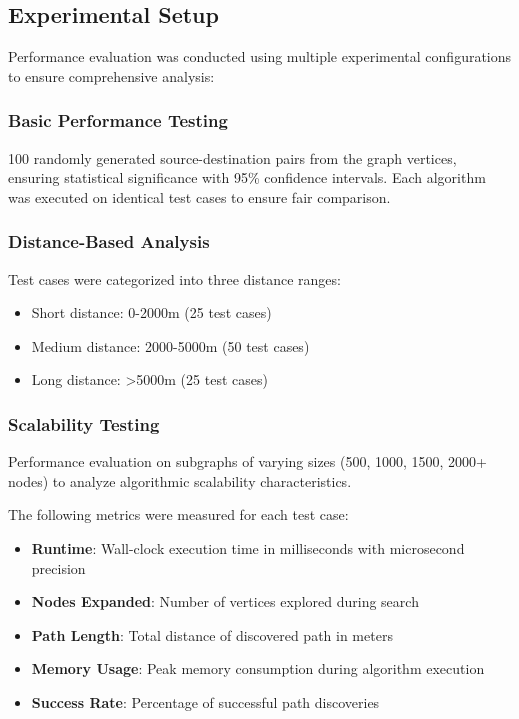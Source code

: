 \documentclass[conference]{IEEEtran}
\begin{document}
\subsection{Experimental Setup}

Performance evaluation was conducted using multiple experimental configurations to ensure comprehensive analysis:

\subsubsection{Basic Performance Testing}
100 randomly generated source-destination pairs from the graph vertices, ensuring statistical significance with 95\% confidence intervals. Each algorithm was executed on identical test cases to ensure fair comparison.

\subsubsection{Distance-Based Analysis}
Test cases were categorized into three distance ranges:
\begin{itemize}
\item Short distance: 0-2000m (25 test cases)
\item Medium distance: 2000-5000m (50 test cases)
\item Long distance: >5000m (25 test cases)
\end{itemize}

\subsubsection{Scalability Testing}
Performance evaluation on subgraphs of varying sizes (500, 1000, 1500, 2000+ nodes) to analyze algorithmic scalability characteristics.

The following metrics were measured for each test case:
\begin{itemize}
\item \textbf{Runtime}: Wall-clock execution time in milliseconds with microsecond precision
\item \textbf{Nodes Expanded}: Number of vertices explored during search
\item \textbf{Path Length}: Total distance of discovered path in meters
\item \textbf{Memory Usage}: Peak memory consumption during algorithm execution
\item \textbf{Success Rate}: Percentage of successful path discoveries
\end{itemize}
\end{document}
